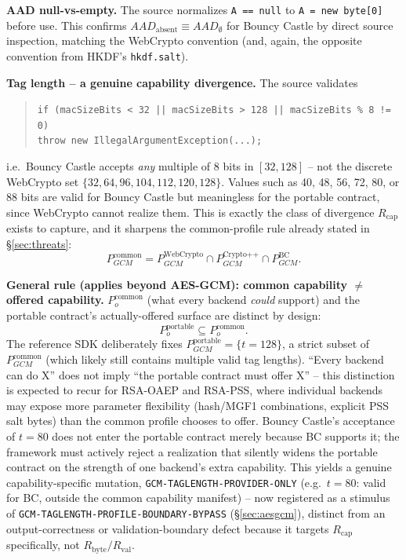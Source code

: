 \documentclass[11pt,a4paper]{article}
\begin{document}
\textbf{AAD null-vs-empty.} The source normalizes \texttt{A == null} to \texttt{A = new byte[0]} before use. This confirms $AAD_{\text{absent}} \equiv AAD_{\emptyset}$ for Bouncy Castle by direct source inspection, matching the WebCrypto convention (and, again, the opposite convention from HKDF's \texttt{hkdf.salt}).

\textbf{Tag length -- a genuine capability divergence.} The source validates
\begin{quote}
\texttt{if (macSizeBits < 32 || macSizeBits > 128 || macSizeBits \% 8 != 0)}\\
\texttt{throw new IllegalArgumentException(...);}
\end{quote}
i.e.\ Bouncy Castle accepts \emph{any} multiple of 8 bits in $[32,128]$ -- not the discrete WebCrypto set $\{32,64,96,104,112,120,128\}$. Values such as 40, 48, 56, 72, 80, or 88 bits are valid for Bouncy Castle but meaningless for the portable contract, since WebCrypto cannot realize them. This is exactly the class of divergence $R_{\text{cap}}$ exists to capture, and it sharpens the common-profile rule already stated in \S\ref{sec:threats}:
\[P_{GCM}^{\text{common}} = P_{GCM}^{\text{WebCrypto}} \cap P_{GCM}^{\text{Crypto++}} \cap P_{GCM}^{\text{BC}}.\]

\textbf{General rule (applies beyond AES-GCM): common capability $\neq$ offered capability.} $P_{o}^{\text{common}}$ (what every backend \emph{could} support) and the portable contract's actually-offered surface are distinct by design:
\[P_{o}^{\text{portable}} \subseteq P_{o}^{\text{common}}.\]
The reference SDK deliberately fixes $P_{GCM}^{\text{portable}} = \{t=128\}$, a strict subset of $P_{GCM}^{\text{common}}$ (which likely still contains multiple valid tag lengths). ``Every backend can do X'' does not imply ``the portable contract must offer X'' -- this distinction is expected to recur for RSA-OAEP and RSA-PSS, where individual backends may expose more parameter flexibility (hash/MGF1 combinations, explicit PSS salt bytes) than the common profile chooses to offer. Bouncy Castle's acceptance of $t=80$ does not enter the portable contract merely because BC supports it; the framework must actively reject a realization that silently widens the portable contract on the strength of one backend's extra capability. This yields a genuine capability-specific mutation, \texttt{GCM-TAGLENGTH-PROVIDER-ONLY} (e.g.\ $t=80$: valid for BC, outside the common capability manifest) -- now registered as a stimulus of \texttt{GCM-TAGLENGTH-PROFILE-BOUNDARY-BYPASS} (\S\ref{sec:aesgcm}), distinct from an output-correctness or validation-boundary defect because it targets $R_{\text{cap}}$ specifically, not $R_{\text{byte}}/R_{\text{val}}$.
\end{document}
